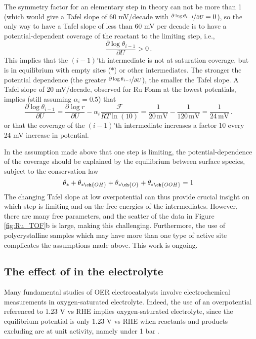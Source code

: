 The symmetry factor for an elementary step in theory can not be more than 1 (which would give a Tafel slope of 60 mV/decade with $\nicefrac{\partial \log{\theta_{i-1}}}{\partial U} = 0$), so the only way to have a Tafel slope of less than 60 mV per decade is to have a potential-dependent coverage of the reactant to the limiting step, i.e., 
\begin{equation}
\frac{\partial \log{\theta_{i-1}}}{\partial U} > 0\,.
\end{equation}
This implies that the $(i-1)$'th intermediate is not at saturation coverage, but is in equilibrium with empty sites ($*$) or other intermediates. The stronger the potential dependence (the greater $\nicefrac{\partial \log{\theta_{i-1}}}{\partial U}$), the smaller the Tafel slope. A Tafel slope of 20 mV/decade, observed for Ru Foam at the lowest potentials, implies (still assuming $\alpha_i=0.5$) that
\begin{equation}
\frac{\partial \log{\theta_{i-1}}}{\partial U} = \frac{\partial \log{r}}{\partial U} - \alpha_i\frac{\mathcal{F}}{RT\ln(10)} =  \frac{1}{20\,\text{mV}} - \frac{1}{120\,\text{mV}} = \frac{1}{24\,\text{mV}}\,.
\end{equation}
or that the coverage of the $(i-1)$'th intermediate increases a factor 10 every 24 mV increase in potential.

In the assumption made above that one step is limiting, the potential-dependence of the coverage should be explained by the equilibrium between surface species, subject to the conservation law
\begin{equation}
 \theta_{*} + \theta_{* \ch{OH}} + \theta_{* \ch{O}} + \theta_{* \ch{OOH}} = 1
\end{equation}
The changing Tafel slope at low overpotential can thus provide crucial insight on which step is limiting and on the free energies of the intermediates. However, there are many free parameters, and the scatter of the data in Figure \ref{fig:Ru_TOF}b is large, making this challenging. Furthermore, the use of polycrystalline samples which may have more than one type of active site complicates the assumptions made above. This work is ongoing.


\subsection{The effect of  in the electrolyte}

Many fundamental studies of OER electrocatalysts involve electrochemical measurements in oxygen-saturated electrolyte. Indeed, the use of an overpotential referenced to 1.23 V vs RHE implies oxygen-saturated electrolyte, since the equilibrium potential is only 1.23 V vs RHE when reactants and products excluding  are at unit activity, namely under 1 bar . 

